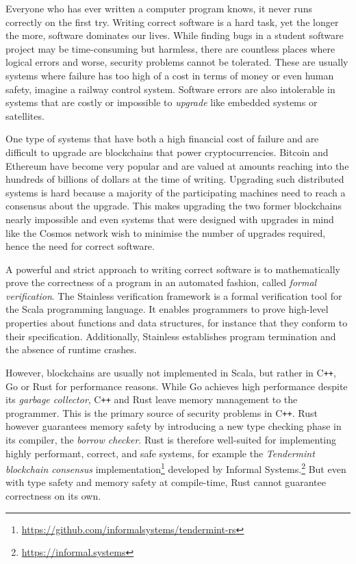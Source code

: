 Everyone who has ever written a computer program knows, it never runs correctly
on the first try. Writing correct software is a hard task, yet the longer the
more, software dominates our lives. While finding bugs in a student software
project may be time-consuming but harmless, there are countless places where
logical errors and worse, security problems cannot be tolerated. These are
usually systems where failure has too high of a cost in terms of money or even
human safety, imagine a railway control system. Software errors are also
intolerable in systems that are costly or impossible to \emph{upgrade} like
embedded systems or satellites.

One type of systems that have both a high financial cost of failure and are
difficult to upgrade are blockchains that power cryptocurrencies. Bitcoin
\cite{bitcoin} and Ethereum \cite{ethereum} have become very popular and are
valued at amounts reaching into the hundreds of billions of dollars at the time
of writing. Upgrading such distributed systems is hard because a majority of the
participating machines need to reach a consensus about the upgrade. This makes
upgrading the two former blockchains nearly impossible and even systems that
were designed with upgrades in mind like the Cosmos network \cite{cosmos} wish
to minimise the number of upgrades required, hence the need for correct
software.

A powerful and strict approach to writing correct software is to mathematically
prove the correctness of a program in an automated fashion, called \emph{formal
verification}. The Stainless verification framework \cite{stainless} is a formal
verification tool for the Scala programming language. It enables programmers to
prove high-level properties about functions and data structures, for instance
that they conform to their specification. Additionally, Stainless establishes
program termination and the absence of runtime crashes.

However, blockchains are usually not implemented in Scala, but rather in
C\texttt{++}, Go or Rust for performance reasons. While Go achieves high
performance despite its \emph{garbage collector}, C\texttt{++} and Rust leave
memory management to the programmer. This is the primary source of security
problems in C\texttt{++}. Rust however guarantees memory safety by introducing a
new type checking phase in its compiler, the \emph{borrow checker}. Rust is
therefore well-suited for implementing highly performant, correct, and safe
systems, for example the \emph{Tendermint blockchain consensus}
implementation\footnote{\url{https://github.com/informalsystems/tendermint-rs}}
developed by Informal Systems.\footnote{\url{https://informal.systems}} But even
with type safety and memory safety at compile-time, Rust cannot guarantee
correctness on its own.

